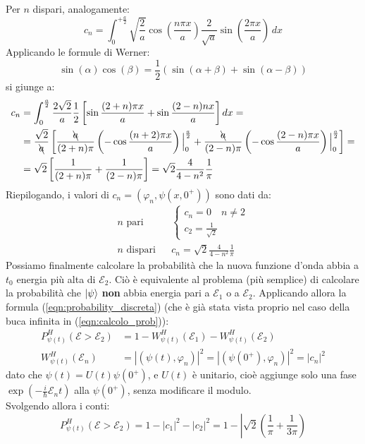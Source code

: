 \documentclass[../../FisicaTeorica.tex]{subfiles}
\begin{document}
\begin{enumerate}
Per $n$ dispari, analogamente:
\[
c_n=\int_0^{+\frac{a}{2}} \sqrt{\frac{2}{a}}\cos\left(\frac{n\pi x}{a}\right)\frac{2}{\sqrt{a}}\sin\left(\frac{2\pi x}{a}\right)\,dx
\]
Applicando le formule di Werner:
\[
\sin(\alpha) \cos (\beta) = \frac{1}{2}\left(\sin(\alpha+\beta)+\sin(\alpha-\beta)\right)
\]
si giunge a:
\begin{align*}
c_n &= \int_0^{\frac{a}{2}}\frac{2\sqrt{2}}{a}\frac{1}{2}\left[\sin\frac{(2+n)\pi x}{a}+\sin\frac{(2-n)n x}{a}\right]dx =\\
&= \frac{\sqrt{2}}{\bcancel{a}}\left[ \frac{\bcancel{a}}{(2+n)\pi}\left(-\cos \frac{(n+2)\pi x}{a}\right)\Big|_{0}^{\frac{a}{2}}+\frac{\bcancel{a}}{(2-n)\pi}\left(-\cos\frac{(2-n)\pi x}{a}\right)\Big|_{0}^{\frac{a}{2}} \right] =\\
&=\sqrt{2}\left[\frac{1}{(2+n)\pi} + \frac{1}{(2-n)\pi}\right]=\sqrt{2}\frac{4}{4-n^2}\frac{1}{\pi}
\end{align*}
Riepilogando, i valori di $c_n=(\varphi_n, \psi(x,0^+))$ sono dati da:
\begin{align*}
\text{$n$ pari} && \begin{cases}
c_n = 0 \quad n \neq 2\\
c_2 = \frac{1}{\sqrt{2}}
\end{cases}\\
\text{$n$ dispari} && c_n=\sqrt{2}\frac{4}{4-n^2}\frac{1}{\pi}
\end{align*}
Possiamo finalmente calcolare la probabilità che la nuova funzione d'onda abbia a $t_0$ energia più alta di $\mathcal{E}_2$. Ciò è equivalente al problema (più semplice) di calcolare la probabilità che $\ket{\psi}$ \textbf{non} abbia energia pari a $\mathcal{E}_1$ o a $\mathcal{E}_2$. Applicando allora la formula (\ref{eqn:probability_discreta}) (che è già stata vista proprio nel caso della buca infinita in (\ref{eqn:calcolo_prob})):
\begin{align*}
P^H_{\psi(t)}(\mathcal{E}>\mathcal{E}_2)&=1-W^H_{\psi(t)}(\mathcal{E}_1)-W^H_{\psi(t)}(\mathcal{E}_2)\\
W^H_{\psi(t)}(\mathcal{E}_n) &= |(\psi(t),\varphi_n)|^2 = |(\psi(0^+),\varphi_n)|^2 = |c_n|^2
\end{align*}
dato che $\psi(t)=U(t)\psi(0^+)$, e $U(t)$ è unitario, cioè aggiunge solo una fase $\exp\left(-\frac{i}{\hbar}\mathcal{E}_n t\right)$ alla $\psi(0^+)$, senza modificare il modulo.\\
Svolgendo allora i conti:
\[
P_{\psi(t)}^H(\mathcal{E}>\mathcal{E}_2)=1-|c_1|^2-|c_2|^2=1-\left|\sqrt{2}\left(\frac{1}{\pi}+\frac{1}{3\pi}\right)
\]
\end{enumerate}
\end{document}
